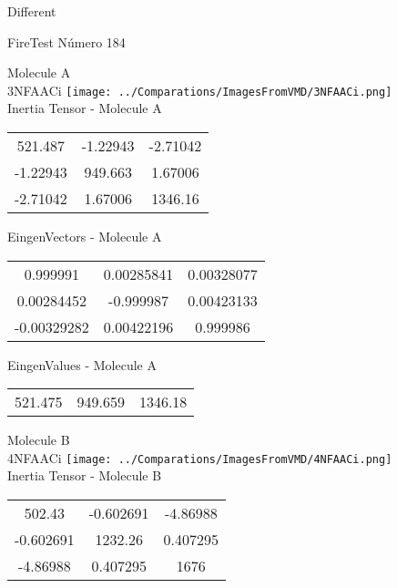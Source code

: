 \begin{center}
\vtab
\vtab
\textcolor{NavyBlue}{\Large Different}
\end{center}

 \newpage

\vtab[-2cm]
\begin{center}
{\large FireTest \tab Número 184}
\end{center}
\begin{multicols}{2}
\begin{center}

Molecule A \\ 
3NFAACi
\texttt{[image: ../Comparations/ImagesFromVMD/3NFAACi.png]}
\\
Inertia Tensor - Molecule A \\
\vtab

\begin{tabular}{|c c c|}
521.487	 & 	-1.22943	 & 	-2.71042	 \\
-1.22943	 & 	949.663	 & 	1.67006	 \\
-2.71042	 & 	1.67006	 & 	1346.16
\end{tabular}

\vtab
 EingenVectors - Molecule A     \\
\vtab
\begin{tabular}{|c c c|}
0.999991	 & 	0.00285841	 & 	0.00328077	 \\
0.00284452	 & 	-0.999987	 & 	0.00423133	 \\
-0.00329282	 & 	0.00422196	 & 	0.999986
\end{tabular}

\vtab
 EingenValues - Molecule A     \\
\vtab
\begin{tabular}{|c c c|}
521.475	 & 	949.659	 & 	1346.18	 \\
\end{tabular}
\columnbreak

Molecule B \\ 
4NFAACi
\texttt{[image: ../Comparations/ImagesFromVMD/4NFAACi.png]}
\\
Inertia Tensor - Molecule B \\
\vtab

\begin{tabular}{|c c c|}
502.43	 & 	-0.602691	 & 	-4.86988	 \\
-0.602691	 & 	1232.26	 & 	0.407295	 \\
-4.86988	 & 	0.407295	 & 	1676
\end{tabular}


\end{center}
\end{multicols}
